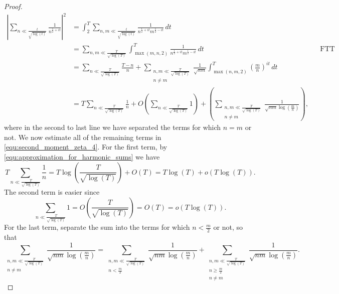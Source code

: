 \begin{proof}
      \begin{equation}\label{equ:second_moment_zeta_4}
        \begin{aligned}
          \left|\sum_{n \ll \frac{t}{\sqrt{\log(t)}}}\frac{1}{n^{\frac{1}{2}+it}}\right|^{2} &= \int_{2}^{T}\sum_{n,m \ll \frac{t}{\sqrt{\log(t)}}}\frac{1}{n^{\frac{1}{2}+it}m^{\frac{1}{2}-it}}\,dt \\
          &= \sum_{n,m \ll \frac{T}{\sqrt{\log(T)}}}\int_{\max(m,n,2)}^{T}\frac{1}{n^{\frac{1}{2}+it}m^{\frac{1}{2}-it}}\,dt && \text{FTT} \\
          &= \sum_{n \ll \frac{T}{\sqrt{\log(T)}}}\frac{T-n}{n}+ \sum_{\substack{n,m \ll \frac{T}{\sqrt{\log(T)}} \\ n \neq m}}\frac{1}{\sqrt{nm}}\int_{\max(n,m,2)}^{T}\left(\frac{m}{n}\right)^{it}\,dt \\
          &= T\sum_{n \ll \frac{T}{\sqrt{\log(T)}}}\frac{1}{n}+O\left(\sum_{n \ll \frac{T}{\sqrt{\log(T)}}}1\right)+\left(\sum_{\substack{n,m \ll \frac{T}{\sqrt{\log(T)}} \\ n \neq m}}\frac{1}{\sqrt{nm}\log\left(\frac{m}{n}\right)}\right),
        \end{aligned}
      \end{equation}
      where in the second to last line we have separated the terms for which $n = m$ or not. We now estimate all of the remaining terms in \cref{equ:second_moment_zeta_4}. For the first term, by \cref{equ:approximation_for_harmonic_sums} we have
      \begin{equation}\label{equ:second_moment_zeta_5}
        T\sum_{n \ll \frac{T}{\sqrt{\log(T)}}}\frac{1}{n} = T\log\left(\frac{T}{\sqrt{\log(T)}}\right)+O(T) = T\log(T)+o(T\log(T)).
      \end{equation}
      The second term is easier since
      \begin{equation}\label{equ:second_moment_zeta_6}
        \sum_{n \ll \frac{T}{\sqrt{\log(T)}}}1 = O\left(\frac{T}{\sqrt{\log(T)}}\right) = O(T) = o(T\log(T)).
      \end{equation}
      For the last term, separate the sum into the terms for which $n < \frac{m}{2}$ or not, so that
      \begin{equation}\label{equ:second_moment_zeta_7}
        \sum_{\substack{n,m \ll \frac{T}{\sqrt{\log(T)}} \\ n \neq m}}\frac{1}{\sqrt{nm}\log\left(\frac{m}{n}\right)} = \sum_{\substack{n,m \ll \frac{T}{\sqrt{\log(T)}} \\ n < \frac{m}{2}}}\frac{1}{\sqrt{nm}\log\left(\frac{m}{n}\right)}+\sum_{\substack{n,m \ll \frac{T}{\sqrt{\log(T)}} \\ n \ge \frac{m}{2} \\ n \neq m}}\frac{1}{\sqrt{nm}\log\left(\frac{m}{n}\right)}.

\end{equation}
\end{proof}

